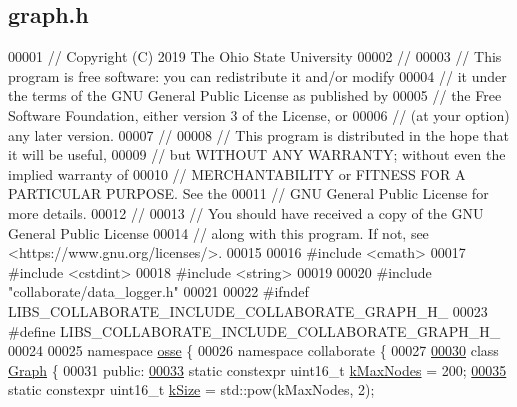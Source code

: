 \hypertarget{graph_8h_source}{}\subsection{graph.\+h}
\label{graph_8h_source}

\begin{DoxyCode}
00001 \textcolor{comment}{// Copyright (C) 2019 The Ohio State University}
00002 \textcolor{comment}{//}
00003 \textcolor{comment}{// This program is free software: you can redistribute it and/or modify}
00004 \textcolor{comment}{// it under the terms of the GNU General Public License as published by}
00005 \textcolor{comment}{// the Free Software Foundation, either version 3 of the License, or}
00006 \textcolor{comment}{// (at your option) any later version.}
00007 \textcolor{comment}{//}
00008 \textcolor{comment}{// This program is distributed in the hope that it will be useful,}
00009 \textcolor{comment}{// but WITHOUT ANY WARRANTY; without even the implied warranty of}
00010 \textcolor{comment}{// MERCHANTABILITY or FITNESS FOR A PARTICULAR PURPOSE.  See the}
00011 \textcolor{comment}{// GNU General Public License for more details.}
00012 \textcolor{comment}{//}
00013 \textcolor{comment}{// You should have received a copy of the GNU General Public License}
00014 \textcolor{comment}{// along with this program.  If not, see <https://www.gnu.org/licenses/>.}
00015 
00016 \textcolor{preprocessor}{#include <cmath>}
00017 \textcolor{preprocessor}{#include <cstdint>}
00018 \textcolor{preprocessor}{#include <string>}
00019 
00020 \textcolor{preprocessor}{#include "collaborate/data\_logger.h"}
00021 
00022 \textcolor{preprocessor}{#ifndef LIBS\_COLLABORATE\_INCLUDE\_COLLABORATE\_GRAPH\_H\_}
00023 \textcolor{preprocessor}{#define LIBS\_COLLABORATE\_INCLUDE\_COLLABORATE\_GRAPH\_H\_}
00024 
00025 \textcolor{keyword}{namespace }\hyperlink{namespaceosse}{osse} \{
00026 \textcolor{keyword}{namespace }collaborate \{
00027 
\hyperlink{classosse_1_1collaborate_1_1_graph}{00030} \textcolor{keyword}{class }\hyperlink{classosse_1_1collaborate_1_1_graph}{Graph} \{
00031  \textcolor{keyword}{public}:
\hyperlink{classosse_1_1collaborate_1_1_graph_a063285c7a14ce7499b355cac87d1900a}{00033}   \textcolor{keyword}{static} constexpr uint16\_t \hyperlink{classosse_1_1collaborate_1_1_graph_a063285c7a14ce7499b355cac87d1900a}{kMaxNodes} = 200;
\hyperlink{classosse_1_1collaborate_1_1_graph_a9c9828305d419d29fc1eed87a4520cd5}{00035}   \textcolor{keyword}{static} constexpr uint16\_t \hyperlink{classosse_1_1collaborate_1_1_graph_a9c9828305d419d29fc1eed87a4520cd5}{kSize} = std::pow(kMaxNodes, 2);

\end{DoxyCode}
